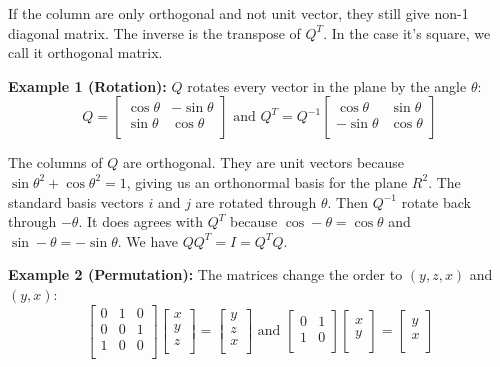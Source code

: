 If the column are only orthogonal and not unit vector, they still give non-1 diagonal matrix. The inverse is the transpose of \(Q^T\). In the case it's square, we call it orthogonal matrix.

\textbf{Example 1 (Rotation):} \(Q\) rotates every vector in the plane by the angle \(\theta \): 
\[
    Q = 
    \begin{bmatrix}
        \cos \theta   & -\sin \theta   \\
        \sin \theta  & \cos \theta   \\
    \end{bmatrix}
    \text{ and }
    Q^T = Q^{-1} 
    \begin{bmatrix}
        \cos \theta  & \sin \theta   \\
        - \sin \theta  & \cos \theta   \\
    \end{bmatrix}
\]   

The columns of \(Q\) are orthogonal. They are unit vectors because \(\sin \theta ^2 + \cos \theta ^2 = 1\), giving us an orthonormal basis for the plane \(R^2\). The standard basis vectors \(i\) and \(j\) are rotated through \(\theta \). Then \(Q^{-1} \) rotate back through \(-\theta \). It does agrees with \(Q^T\) because \(\cos -\theta = \cos  \theta \) and \(\sin  -\theta = -\sin \theta   \). We have \(QQ^T = I = Q^T Q\). 

\textbf{Example 2 (Permutation): } The matrices change the order to \((y, z, x)\) and \((y, x)\):
\[
    \begin{bmatrix}
        0 & 1 & 0  \\
        0 & 0 & 1  \\
        1 & 0 & 0  \\
    \end{bmatrix}
    \begin{bmatrix}
         x \\
         y \\
         z \\
    \end{bmatrix}
    = 
    \begin{bmatrix}
         y \\
         z \\
         x \\
    \end{bmatrix}
    \text{ and } 
    \begin{bmatrix}
        0 &  1 \\
        1 &  0 \\
    \end{bmatrix}
    \begin{bmatrix}
         x \\
         y \\
    \end{bmatrix}
    = 
    \begin{bmatrix}
         y \\
         x \\
    \end{bmatrix}
\]   

